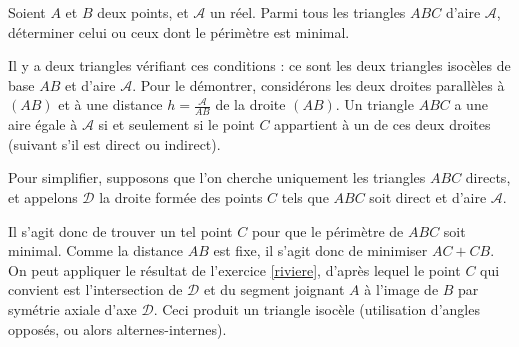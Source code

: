 
\begin{exo}
Soient $A$ et $B$ deux points, et $\mathcal A$ un réel. Parmi tous les triangles $ABC$ d'aire $\mathcal A$, déterminer celui ou ceux dont le périmètre est minimal.
\begin{sol}
Il y a deux triangles vérifiant ces conditions : ce sont les deux triangles isocèles de base $AB$ et d'aire $\mathcal A$. Pour le démontrer, considérons les deux droites parallèles à $(AB)$ et à une distance $h =\frac{\mathcal A}{ AB}$ de la droite $(AB)$. Un triangle $ABC$ a une aire égale à $\mathcal A$ si et seulement si le point $C$ appartient à un de ces deux droites (suivant s'il est direct ou indirect).

Pour simplifier, supposons que l'on cherche uniquement les triangles $ABC$ directs, et appelons $\mathcal D$ la droite formée des points $C$ tels que $ABC$ soit direct et d'aire $\mathcal A$.

Il s'agit donc de trouver un tel point $C$ pour que le périmètre de $ABC$ soit minimal. Comme la distance $AB$ est fixe, il s'agit donc de minimiser $AC+CB$. On peut appliquer le résultat de l'exercice \ref{riviere}, d'après lequel le point $C$ qui convient est l'intersection de $\mathcal D$ et du segment joignant $A$ à l'image de $B$ par symétrie axiale d'axe $\mathcal D$. Ceci produit un triangle isocèle (utilisation d'angles opposés, ou alors alternes-internes).
\end{sol}
\end{exo}

